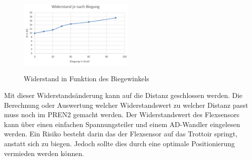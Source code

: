 \begin{figure}[H]
	\centering
	\includegraphics[width=0.5\textwidth]{03_Loesungskonzept/pictures/Flex_Biegungskennline.png}
	\label{fig:Flex_R_Kennlinie}
	\caption{Widerstand in Funktion des Biegewinkels}
\end{figure}\flushleft
%
Mit dieser Widerstandsänderung kann auf die Distanz geschlossen werden. Die Berechnung oder Auswertung welcher Widerstandswert zu welcher Distanz passt muss noch im PREN2 gemacht werden. Der Widerstandswert des Flexsensors kann über einen einfachen Spannungsteiler und einem AD-Wandler eingelesen werden.
Ein Risiko besteht darin das der Flexsensor auf das Trottoir springt, anstatt sich zu biegen. Jedoch sollte dies durch eine optimale Positionierung vermieden werden können.\\[0.2cm]